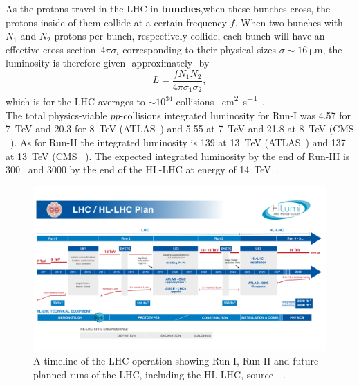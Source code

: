 As the protons travel in the LHC in \textbf{bunches},when these bunches cross, the protons inside of them collide at a certain frequency $f$.  When two bunches with $N_1$ and $N_2$ protons per bunch, respectively collide, each bunch will have an effective cross-section~$4 \pi \sigma_i$ corresponding to their physical sizes $\sigma \sim \SI{16}{\micro \meter}$, the luminosity is therefore given -approximately- by 
\begin{equation}
	L = \frac{f N_1 N_2}{4 \pi  \sigma_1 \sigma_2},
\end{equation}
which is for the LHC averages to  $\sim 10^{34}$ collisions \si{\per \centi\metre\squared \per \second}~\cite{closer,lhcpreformance}.  \\ The total physics-viable $pp$-collisions  integrated luminosity for Run-I was \SI{4.57}{\infb} for \SI{7}{\tera\electronvolt} and \SI{20.3}{\infb} for \SI{8}{\tera\electronvolt} (ATLAS~\cite{atlaslumi1}) and  \SI{5.55}{\infb} at \SI{7}{\tera\electronvolt} and \SI{21.8}{\infb} at \SI{8}{\tera\electronvolt} (CMS ~\cite{cmslumi}). As for Run-II the integrated luminosity is \SI{139}{\infb} at \SI{13}{\tera\electronvolt } (ATLAS~\cite{atlaslumi2})  and \SI{137}{\infb} at \SI{13}{\tera\electronvolt } (CMS ~\cite{cmslumi}). The expected integrated luminosity by the end of Run-III is  \SI{300}{\infb}~\cite{Fartoukh:2790409} and \SI{3000}{\infb} by the end of the HL-LHC at energy of \SI{14}{\tera\electronvolt }~\cite{Apollinari:2015bam}. 
\begin{figure}[htbp!]
	\centering
	\includegraphics[width=\textwidth]{figures/HL-LHC-plan-2021-1}
	\caption{ A timeline of the LHC operation showing Run-I, Run-II and future planned runs of the LHC, including the HL-LHC, source~~\cite{lhckomission}. 
	}
	\label{fig:lhcplan}
\end{figure}
